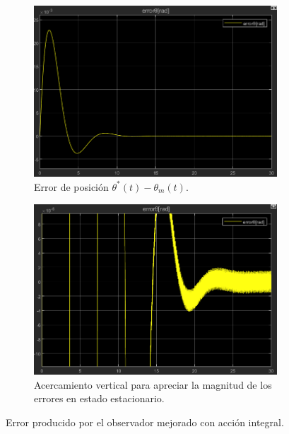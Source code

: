 \documentclass{article}
\begin{document}
\begin{figure}[H]
    \centering
    \begin{subfigure}[t]{0.45\textwidth}
        \centering
        \includegraphics[width=\textwidth]{Imagenes/ErrorPosicionPerturbacionPID.png}
        \caption{Error de posición \(\theta^*(t)-\theta_m(t)\).}
        \label{fig:ErrorPosicionPerturbacionPID}
    \end{subfigure}
    \hfill %
    \begin{subfigure}[t]{0.45\textwidth}
        \centering
        \includegraphics[width=\textwidth]{Imagenes/AcercamientoErrorPosicionPerturbacionPID.png}
        \caption{Acercamiento vertical para apreciar la magnitud de los errores en estado estacionario.}
        \label{fig:AcercamientoErrorPosicionPerturbacionPID}
    \end{subfigure}
    \caption{Error producido por el observador mejorado con acción integral.}
    \label{fig:Error_posicion_observador_ReducidoPID}
\end{figure}
\end{document}
